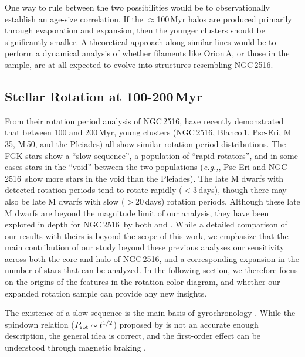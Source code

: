 \documentclass[12pt,twocolumn,tighten]{aastex63}
\newcommand{\cn}{NGC\,2516} %
\begin{document}
One way to rule between the two possibilities would be to
observationally establish an age-size correlation.  If the
$\approx$100\,Myr halos are produced primarily through evaporation and
expansion, then the younger clusters should be significantly smaller.
A theoretical approach along similar lines would be to perform a
dynamical analysis of whether filaments like Orion\,A, or those in the
\citet{zucker_physical_2018} sample, are at all expected to evolve
into structures resembling \cn.


\subsection{Stellar Rotation at 100-200\,Myr}
\label{disc:rotn}

From their rotation period analysis of \cn,
\citet{fritzewski_rotation_2020} have recently demonstrated that
between 100 and 200\,Myr, young clusters (\cn, Blanco\,1, Psc-Eri,
M\,35, M\,50, and the Pleiades) all show similar rotation period
distributions.  The FGK stars show a ``slow sequence'', a population
of ``rapid rotators'', and in some cases stars in the ``void'' between
the two populations ({\it e.g.,}, Psc-Eri and \cn\ show more stars in
the void than the Pleiades).  The late M dwarfs with detected rotation
periods tend to rotate rapidly ($<3$\,days), though there may also be
late M dwarfs with slow ($>20$\,days) rotation periods.  Although
these late M dwarfs are beyond the magnitude limit of our analysis,
they have been explored in depth for \cn\ by both
\citet{Irwin_NGC2516_2007} and \citet{fritzewski_rotation_2020}.
While a detailed comparison of our results with theirs is beyond the
scope of this work, we emphasize that the main contribution of our
study beyond these previous analyses our sensitivity
across both the core and halo of \cn, and a
corresponding expansion in the number of stars that can be analyzed.
In the following section, we therefore focus on the origins of the
features in the rotation-color diagram, and whether our expanded
rotation sample can provide any new insights.

The existence of a slow sequence is the main basis of gyrochronology
\citep[{\it e.g.},][]{barnes_rotational_2003}.  While the 
spindown relation ($P_{\rm rot}\sim t^{1/2}$) proposed by
\citet{skumanich_time_1972} is not an accurate enough description, the
general idea is correct, and the first-order effect can be understood
through magnetic braking \citep{weber_angular_1967}.
\end{document}

